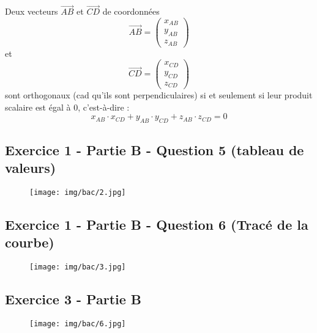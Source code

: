 \documentclass[answers]{exam}
\begin{document}
Deux vecteurs $\overrightarrow{AB}$ et $\overrightarrow{CD}$ de coordonnées \\ 

\[
  \overrightarrow{AB} = 
  \begin{pmatrix}
    x_{AB} \\
    y_{AB} \\ 
    z_{AB}
  \end{pmatrix}
\] et
\[
  \overrightarrow{CD} = 
  \begin{pmatrix}
    x_{CD} \\
    y_{CD} \\ 
    z_{CD}
  \end{pmatrix}
\]
sont orthogonaux (cad qu'ils sont perpendiculaires) si et seulement si leur produit scalaire est égal à 0, c'est-à-dire : 
\[
  x_{AB} \cdot x_{CD} + y_{AB} \cdot y_{CD} + z_{AB} \cdot z_{CD} = 0
\]

\subsection*{Exercice 1 - Partie B - Question 5 (tableau de valeurs)}

\begin{figure}[H]
  \centering
  \texttt{[image: img/bac/2.jpg]}
\end{figure}

\subsection*{Exercice 1 - Partie B - Question 6 (Tracé de la courbe)}

\begin{figure}[H]
  \centering
  \texttt{[image: img/bac/3.jpg]}
\end{figure}

\subsection*{Exercice 3 - Partie B}

\begin{figure}[H]
  \centering
  \texttt{[image: img/bac/6.jpg]}
\end{figure}
\end{document}
